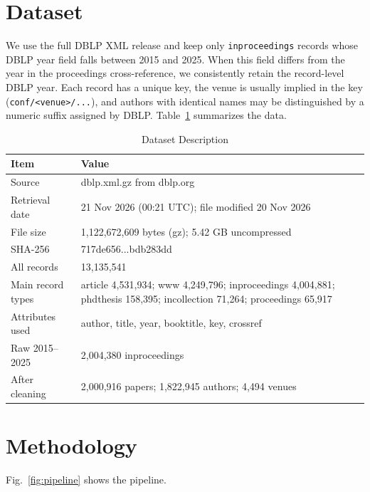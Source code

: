 \documentclass[conference]{IEEEtran}
\begin{document}
\section{Dataset}
We use the full DBLP XML release \cite{dblp} and keep only \texttt{inproceedings} records whose DBLP year field falls between 2015 and 2025. When this field differs from the year in the proceedings cross-reference, we consistently retain the record-level DBLP year. Each record has a unique key, the venue is usually implied in the key (\texttt{conf/<venue>/...}), and authors with identical names may be distinguished by a numeric suffix assigned by DBLP. Table~\ref{tab:dataset} summarizes the data.

\begin{table}[t]
\caption{Dataset Description}
\label{tab:dataset}
\centering
\footnotesize
\begin{tabular}{p{2.3cm}p{5.1cm}}
\toprule
Item & Value \\
\midrule
Source & dblp.xml.gz from dblp.org \cite{dblp} \\
Retrieval date & 21 Nov 2026 (00:21 UTC); file modified 20 Nov 2026 \\
File size & 1,122,672,609 bytes (gz); 5.42 GB uncompressed \\
SHA-256 & 717de656...bdb283dd \\
All records & 13,135,541 \\
Main record types & article 4,531,934; www 4,249,796; inproceedings 4,004,881; phdthesis 158,395; incollection 71,264; proceedings 65,917 \\
Attributes used & author, title, year, booktitle, key, crossref \\
Raw 2015--2025 & 2,004,380 inproceedings \\
After cleaning & 2,000,916 papers; 1,822,945 authors; 4,494 venues \\
\bottomrule
\end{tabular}
\end{table}

\section{Methodology}
Fig.~\ref{fig:pipeline} shows the pipeline.
\end{document}
